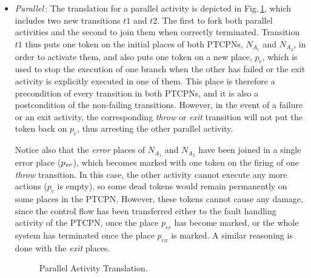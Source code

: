 \begin{itemize}
\item {\it Parallel}\,: The translation for a parallel activity is depicted
in Fig.\,\ref{par}, which includes two new transitions $t1$ and
$t2$. The first to fork both parallel activities
and the second to join them when correctly terminated. 
Transition $t1$ thus puts one token on the initial places of both
PTCPNs, $N_{A_1}$ and $N_{A_2}$, in order to activate them,
and also puts one token on a new place, $p_c$, which is
used to stop the execution of one branch when the other has
failed or the exit activity is explicitly executed in one of them.
This place is therefore a precondition of every 
transition in both PTCPNs, and it is also a postcondition
of the non-failing transitions. However, in the event
of a failure or an exit activity, the corresponding {\em throw} or {\em exit}  transition
will not put the token back on $p_c$, thus
arresting the other parallel activity.

Notice also that the {\em error} places of ${N}_{A_{1}}$ and $N_{A_{2}}$
have been joined in a single error place ($p_{\it er}$),
which becomes marked with one token on
the firing of one {\em throw} transition. 
In this case, the other activity cannot execute any
more actions ($p_c$ is empty), so some dead tokens would
remain permanently on some places in the PTCPN.
However, these tokens cannot cause
any damage, since the control flow has been
transferred either to the fault handling activity of the PTCPN, 
once the place $p_{er}$ has become marked, or the whole system has terminated once 
the place $p_{ex}$ is marked. A similar reasoning is done with the {\em exit} places.

\begin{figure}[!ht]
\begin{center}
\end{center}
\caption{\label{par} Parallel Activity Translation.}
\end{figure}


\end{itemize}
